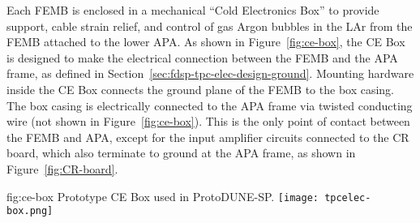 Each FEMB is enclosed in a mechanical ``Cold Electronics Box'' to provide support, cable strain relief,
and control of gas Argon bubbles in the LAr from the FEMB attached to the lower APA. 
As shown in Figure~\ref{fig:ce-box}, the CE Box is designed to make the electrical connection 
between the FEMB and the APA frame, as defined in Section~\ref{sec:fdsp-tpc-elec-design-ground}. Mounting 
hardware inside the CE Box connects the ground plane of the FEMB to the box casing. The
box casing is electrically connected to the APA frame via twisted conducting wire (not 
shown in Figure~\ref{fig:ce-box}). This is the only point of contact between the FEMB and
APA, except for the input amplifier circuits connected to the CR board, which also terminate to
ground at the APA frame, as shown in Figure~\ref{fig:CR-board}.

\begin{dunefigure}
{fig:ce-box}
{Prototype CE Box used in ProtoDUNE-SP.}
\texttt{[image: tpcelec-box.png]}
\end{dunefigure}
